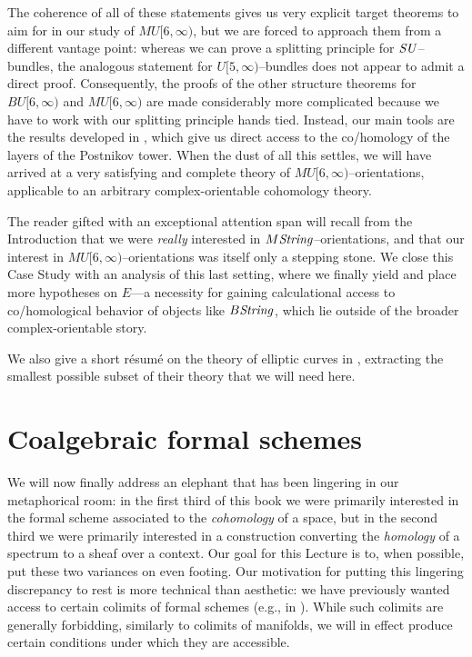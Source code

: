 The coherence of all of these statements gives us very explicit target theorems to aim for in our study of $MU[6, \infty)$, but we are forced to approach them from a different vantage point: whereas we can prove a splitting principle for $\mathit{SU}$--bundles, the analogous statement for $U[5, \infty)$--bundles does not appear to admit a direct proof.  Consequently, the proofs of the other structure theorems for $BU[6, \infty)$ and $MU[6, \infty)$ are made considerably more complicated because we have to work with our splitting principle hands tied.  Instead, our main tools are the results developed in , which give us direct access to the co/homology of the layers of the Postnikov tower.  When the dust of all this settles, we will have arrived at a very satisfying and complete theory of $MU[6, \infty)$--orientations, applicable to an arbitrary complex-orientable cohomology theory.

The reader gifted with an exceptional attention span will recall from the Introduction that we were \emph{really} interested in $M\mathit{String}$--orientations, and that our interest in $MU[6, \infty)$--orientations was itself only a stepping stone.  We close this Case Study with an analysis of this last setting, where we finally yield and place more hypotheses on $E$---a necessity for gaining calculational access to co/homological behavior of objects like $B\mathit{String}$, which lie outside of the broader complex-orientable story.

We also give a short r\'esum\'e on the theory of elliptic curves in , extracting the smallest possible subset of their theory that we will need here.









\section{Coalgebraic formal schemes}

We will now finally address an elephant that has been lingering in our metaphorical room: in the first third of this book we were primarily interested in the formal scheme associated to the \emph{cohomology} of a space, but in the second third we were primarily interested in a construction converting the \emph{homology} of a spectrum to a sheaf over a context.  Our goal for this Lecture is to, when possible, put these two variances on even footing.  Our motivation for putting this lingering discrepancy to rest is more technical than aesthetic: we have previously wanted access to certain colimits of formal schemes (e.g., in ).  While such colimits are generally forbidding, similarly to colimits of manifolds, we will in effect produce certain conditions under which they are accessible.

